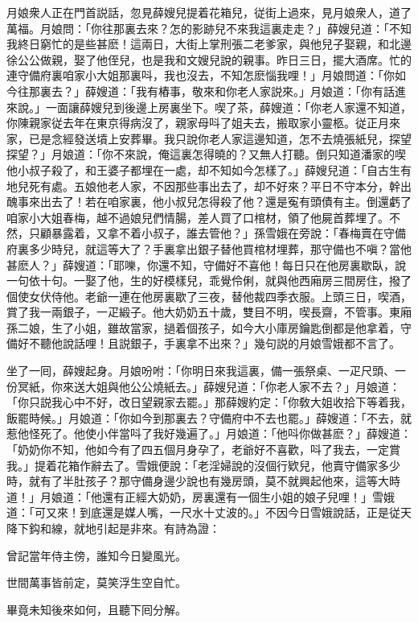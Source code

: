 月娘衆人正在門首説話，忽見薛嫂兒提着花箱兒，従街上過來，見月娘衆人，道了萬福。月娘問：「你往那裏去來？怎的影跡兒不來我這裏走走？」薛嫂兒道：「不知我終日窮忙的是些甚麽！這兩日，大街上掌刑張二老爹家，與他兒子娶親，和北邊徐公公做親，娶了他侄兒，也是我和文嫂兒說的親事。昨日三日，擺大酒席。忙的連守備府裏咱家小大姐那裏呌，我也沒去，不知怎麽惱我哩！」月娘問道：「你如今往那裏去？」薛嫂道：「我有樁事，敬來和你老人家説來。」月娘道：「你有話進來說。」一面讓薛嫂兒到後邊上房裏坐下。喫了茶，薛嫂道：「你老人家還不知道，你陳親家従去年在東京得病沒了，親家母呌了姐夫去，搬取家小靈柩。従正月來家，已是念經發送墳上安葬畢。我只說你老人家這邊知道，怎不去燒張紙兒，探望探望？」月娘道：「你不來說，俺這裏怎得曉的？又無人打聽。倒只知道潘家的喫他小叔子殺了，和王婆子都埋在一處，却不知如今怎樣了。」薛嫂兒道：「自古生有地兒死有處。五娘他老人家，不因那些事出去了，却不好來？平日不守本分，幹出醜事來出去了！若在咱家裏，他小叔兒怎得殺了他？還是寃有頭債有主。倒還虧了咱家小大姐春梅，越不過娘兒們情腸，差人買了口棺材，領了他屍首葬埋了。不然，只顧暴露着，又拿不着小叔子，誰去管他？」孫雪娥在旁說：「春梅賣在守備府裏多少時兒，就這等大了？手裏拿出銀子替他買棺材埋葬，那守備也不嗔？當他甚麽人？」薛嫂道：「耶嚛，你還不知，守備好不喜他！每日只在他房裏歇臥，說一句依十句。一娶了他，生的好模樣兒，乖覺伶俐，就與他西廂房三間房住，撥了個使女伏侍他。老爺一連在他房裏歇了三夜，替他裁四季衣服。上頭三日，喫酒，賞了我一兩銀子，一疋緞子。他大奶奶五十歲，雙目不明，喫長齋，不管事。東廂孫二娘，生了小姐，雖故當家，撾着個孩子，如今大小庫房鑰匙倒都是他拿着，守備好不聽他說話哩！且説銀子，手裏拿不出來？」幾句説的月娘雪娥都不言了。

坐了一囘，薛嫂起身。月娘吩咐：「你明日來我這裏，備一張祭桌、一疋尺頭、一份冥紙，你來送大姐與他公公燒紙去。」薛嫂兒道：「你老人家不去？」月娘道：「你只説我心中不好，改日望親家去罷。」那薛嫂約定：「你敎大姐收拾下等着我，飯罷時候。」月娘道：「你如今到那裏去？守備府中不去也罷。」薛嫂道：「不去，就惹他怪死了。他使小伴當呌了我好幾遍了。」月娘道：「他呌你做甚麽？」薛嫂道：「奶奶你不知，他如今有了四五個月身孕了，老爺好不喜歡，呌了我去，一定賞我。」提着花箱作辭去了。雪娥便說：「老淫婦說的沒個行欵兒，他賣守備家多少時，就有了半肚孩子？那守備身邊少說也有幾房頭，莫不就興起他來，這等大時道！」月娘道：「他還有正經大奶奶，房裏還有一個生小姐的娘子兒哩！」雪娥道：「可又來！到底還是媒人嘴，一尺水十丈波的。」不因今日雪娥說話，正是従天降下鈎和線，就地引起是非來。有詩為證：

曾記當年侍主傍，誰知今日變風光。

世間萬事皆前定，莫笑浮生空自忙。

畢竟未知後來如何，且聽下囘分解。

